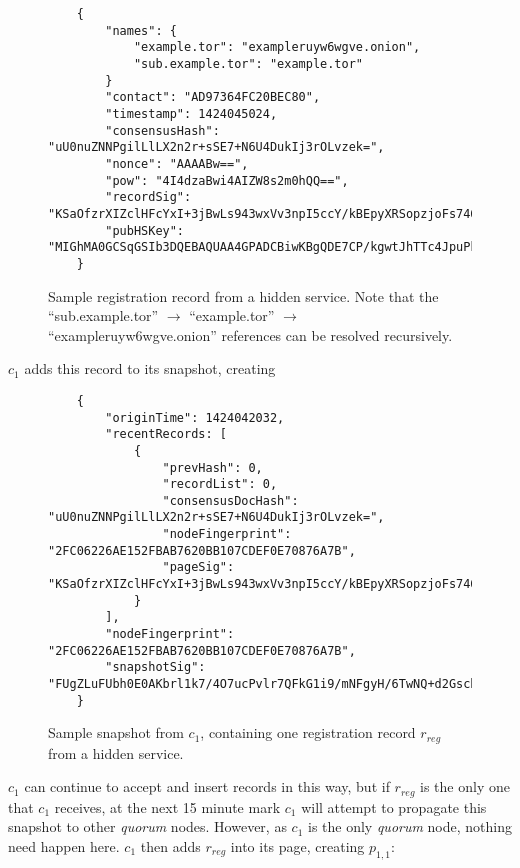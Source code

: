 \begin{figure}
	\begin{lstlisting}
	{
		"names": {
			"example.tor": "exampleruyw6wgve.onion",
			"sub.example.tor": "example.tor"
		}
		"contact": "AD97364FC20BEC80",
		"timestamp": 1424045024,
		"consensusHash": "uU0nuZNNPgilLlLX2n2r+sSE7+N6U4DukIj3rOLvzek=",
		"nonce": "AAAABw==",
		"pow": "4I4dzaBwi4AIZW8s2m0hQQ==",
		"recordSig": 	"KSaOfzrXIZclHFcYxI+3jBwLs943wxVv3npI5ccY/kBEpyXRSopzjoFs746n0tJqUpdY4Kbe6DBwERaN7ELmSSK9Pu6q8QeKzNAh+QOnKl0fKBN7fqowjkQ3ktFkR0Vuox9WrrbNTMa4+up0Np52hlbKA3zSRz4fbR9NVlh6uuQ=",
		"pubHSKey": "MIGhMA0GCSqGSIb3DQEBAQUAA4GPADCBiwKBgQDE7CP/kgwtJhTTc4JpuPkvA7Ln9wgc+fgTKgkyUp1zusxgUAn1c1MGx4YhO42KPB7dyZOf3pcRk94XsYFY1ULkF2+tf9KdNe7GFzJyMFCQENnUcVXbcwLH4vAeiGK7R/nScbCbyc9LT+VE1fbKchTL1QzLVBLqJTxhR+9YPi8x+QIFAdZ8BJs="
	}
	\end{lstlisting}
	\caption{Sample registration record from a hidden service. Note that the ``sub.example.tor'' $ \to $ ``example.tor'' $ \to $ ``exampleruyw6wgve.onion'' references can be resolved recursively.}
	\label{sampleLabel}
\end{figure}

$ c_{1} $ adds this record to its snapshot, creating

\begin{figure}
	\begin{lstlisting}
	{
		"originTime": 1424042032,
		"recentRecords: [
			{
				"prevHash": 0,
				"recordList": 0,
				"consensusDocHash": "uU0nuZNNPgilLlLX2n2r+sSE7+N6U4DukIj3rOLvzek=",
				"nodeFingerprint": "2FC06226AE152FBAB7620BB107CDEF0E70876A7B",
				"pageSig": 	"KSaOfzrXIZclHFcYxI+3jBwLs943wxVv3npI5ccY/kBEpyXRSopzjoFs746n0tJqUpdY4Kbe6DBwERaN7ELmSSK9Pu6q8QeKzNAh+QOnKl0fKBN7fqowjkQ3ktFkR0Vuox9WrrbNTMa4+up0Np52hlbKA3zSRz4fbR9NVlh6uuQ="
			}
		],
		"nodeFingerprint": "2FC06226AE152FBAB7620BB107CDEF0E70876A7B",
		"snapshotSig": "FUgZLuFUbh0E0AKbrl1k7/4O7ucPvlr7QFkG1i9/mNFgyH/6TwNQ+d2Gsch/9FaN6ZjyHAnvjmSpRRSngR0UD20FwpAZ1vCVA0qO2yDZeuBd6DiNSkkdSueRHOF7OD95Rb04JmAk1jXjEgFb+BH3hUH54ZEaqlJvQ8tBQJ7YtAc="
	}
	\end{lstlisting}
	\caption{Sample snapshot from $ c_{1} $, containing one registration record $ r_{reg} $ from a hidden service.}
	\label{sampleLabel}
\end{figure}

$ c_{1} $ can continue to accept and insert records in this way, but if $ r_{reg} $ is the only one that $ c_{1} $ receives, at the next 15 minute mark $ c_{1} $ will attempt to propagate this snapshot to other \emph{quorum} nodes. However, as $ c_{1} $ is the only \emph{quorum} node, nothing need happen here. $ c_{1} $ then adds $ r_{reg} $ into its page, creating $ p_{1,1} $:

